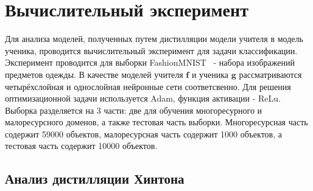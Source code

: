 \newpage

\section{Вычислительный эксперимент}

Для анализа моделей, полученных путем дистилляции модели учителя в модель ученика, проводится вычислительный эксперимент для задачи классификации.\\
Эксперимент проводится для выборки FashionMNIST~\cite{FMNIST} - набора изображений предметов одежды. В качестве моделей учителя $\textbf{f}$ и ученика $\textbf{g}$ рассматриваются четырёхслойная и однослойная нейронные сети соответсвенно. Для решения оптимизационной задачи используется Adam, функция активации - ReLu.\\
Выборка разделяется на 3 части: две для обучения многоресурного и малоресурсного доменов, а также тестовая часть выборки. Многоресурсная часть содержит 59000 объектов, малоресурсная часть содержит 1000 объектов, а тестовая часть содержит 10000 объектов.

\subsection{Анализ дистилляции Хинтона}

